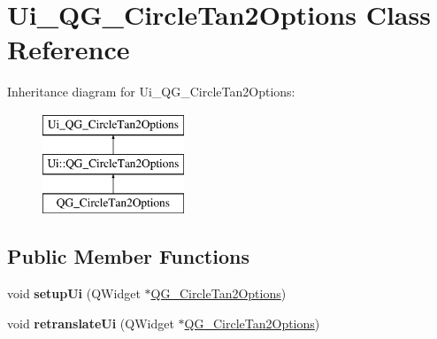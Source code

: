 \hypertarget{classUi__QG__CircleTan2Options}{\section{Ui\-\_\-\-Q\-G\-\_\-\-Circle\-Tan2\-Options Class Reference}
\label{classUi__QG__CircleTan2Options}
}
Inheritance diagram for Ui\-\_\-\-Q\-G\-\_\-\-Circle\-Tan2\-Options\-:\begin{figure}[H]
\begin{center}
\leavevmode
\includegraphics[height=3.000000cm]{classUi__QG__CircleTan2Options}
\end{center}
\end{figure}
\subsection*{Public Member Functions}
\begin{DoxyCompactItemize}
\item 
\hypertarget{classUi__QG__CircleTan2Options_a3db87b445bf96b0b244cc9ce5f9f665f}{void {\bfseries setup\-Ui} (Q\-Widget $\ast$\hyperlink{classQG__CircleTan2Options}{Q\-G\-\_\-\-Circle\-Tan2\-Options})}\label{classUi__QG__CircleTan2Options_a3db87b445bf96b0b244cc9ce5f9f665f}

\item 
\hypertarget{classUi__QG__CircleTan2Options_a11d72ecdfe0bc782d91f6c46bccb6b83}{void {\bfseries retranslate\-Ui} (Q\-Widget $\ast$\hyperlink{classQG__CircleTan2Options}{Q\-G\-\_\-\-Circle\-Tan2\-Options})}\label{classUi__QG__CircleTan2Options_a11d72ecdfe0bc782d91f6c46bccb6b83}

\end{DoxyCompactItemize}
